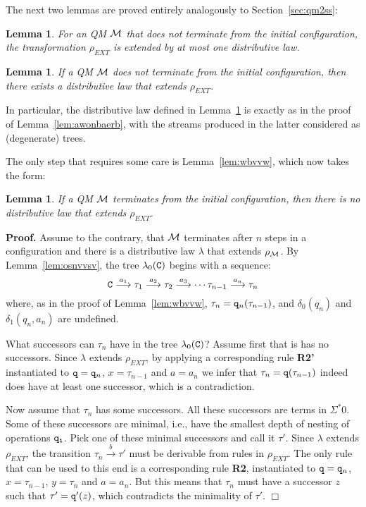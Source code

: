 \documentclass[adraft,copyright,creativecommons]{eptcs}
\newtheorem{lemma}[theorem]{Lemma}
\newenvironment{proof}[1][Proof]{\noindent\textbf{#1.} }{{\hfill $\Box$ \\}}
\newcommand{\Ss}{\Sigma^*}
\newcommand{\goes}[1]{\stackrel{#1}{\longrightarrow}}
\begin{document}
The next two lemmas are proved entirely analogously to Section~\ref{sec:qm2ss}:

\begin{lemma}\label{lem:wainbvwavaw}\rm
For an QM ${\cal M}$ that does not terminate from the initial configuration, the transformation $\rho_{EXT}$ is extended by at most one distributive law.
\end{lemma}

\begin{lemma}\label{lem:tyjdrtvx}\rm
If a QM ${\cal M}$ does not terminate from the initial configuration, then there exists a distributive law that extends $\rho_{EXT}$.
\end{lemma}

In particular, the distributive law defined in Lemma~\ref{lem:tyjdrtvx} is exactly as in the proof of Lemma~\ref{lem:awonbaerb}, with the streams produced in the latter considered as (degenerate) trees.

The only step that requires some care is Lemma~\ref{lem:wbvvw}, which now takes the form:

\begin{lemma}\label{lem:bnobbes}\rm
If a QM ${\cal M}$ terminates from the initial configuration, then there is no distributive law that extends $\rho_{EXT}$.
\end{lemma}
\begin{proof}
Assume to the contrary, that $\cal M$ terminates after $n$ steps in a configuration and there is a distributive law $\lambda$ that extends $\rho_{\cal M}$. By Lemma~\ref{lem:osnvvsv}, the tree $\lambda_0({\tt C})$ begins with a sequence:
\[
{\tt C} \goes{a_1}\tau_1\goes{a_2}\tau_2\goes{a_3}\cdots\tau_{n-1}\goes{a_n}\tau_n
\] 
where, as in the proof of Lemma~\ref{lem:wbvvw}, $\tau_n={\tt q}_n(\tau_{n-1})$, and $\delta_0(q_n)$ and $\delta_1(q_n,a_n)$ are undefined.

What successors can $\tau_n$ have in the tree $\lambda_0({\tt C})$? Assume first that is has no successors. Since $\lambda$ extends $\rho_{EXT}$, by applying a corresponding rule {\bf R2'} instantiated to ${\tt q}={\tt q}_n$, $x=\tau_{n-1}$ and $a=a_{n}$ we infer that $\tau_n={\tt q}(\tau_{n-1})$ indeed does have at least one successor, which is a contradiction.

Now assume that $\tau_n$ has some successors. All these successors are terms in $\Ss 0$. Some of these successors are minimal, i.e., have the smallest depth of nesting of operations $\tt q_i$. Pick one of these minimal successors and call it $\tau'$. Since $\lambda$ extends $\rho_{EXT}$, the transition $\tau_n\goes{b}\tau'$ must be derivable from rules in $\rho_{EXT}$. The only rule that can be used to this end is a corresponding rule {\bf R2}, instantiated to ${\tt q}={\tt q}_n$, $x=\tau_{n-1}$, $y=\tau_n$ and $a=a_{n}$. But this means that $\tau_n$ must have a successor $z$ such that $\tau'={\tt q'}(z)$, which contradicts the minimality of $\tau'$.
\end{proof}
\end{document}
